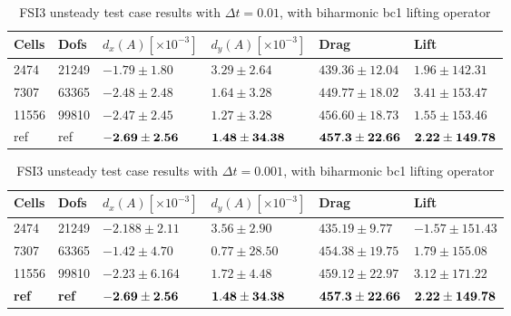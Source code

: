 \begin{table}[H]
\centering
\caption{FSI3 unsteady test case results with $\Delta t = 0.01$, with biharmonic bc1 lifting operator}
\label{tab:FSI3_001}
\begin{tabular}{|l|l|l|l|l|l|}
\hline
Cells & Dofs & $d_x (A)[\times10^{-3} ]$ & $d_y (A)[\times10^{-3} ]$ & Drag & Lift \\ \hline
2474 & 21249 & $-1.79 \pm 1.80$ & $3.29 \pm 2.64$ & $439.36 \pm 12.04$ & $1.96 \pm 142.31$ \\ \hline
7307 & 63365 & $-2.48 \pm 2.48$ & $ 1.64 \pm 3.28$ & $449.77 \pm 18.02$ & $3.41 \pm 153.47$ \\ \hline
11556 & 99810 & $ -2.47 \pm 2.45$ & $ 1.27 \pm 3.28$ & $456.60 \pm 18.73$ & $1.55 \pm 153.46$ \\ \hline
ref & ref & $\bold{-2.69 \pm  2.56}$ & $\bold{1.48 \pm 34.38}$ & $\bold{457.3 \pm 22.66}$ & $\bold{2.22 \pm 149.78}$ \\ \hline
\end{tabular}
\end{table}

\begin{table}[H]
\centering
\caption{FSI3 unsteady test case results with $\Delta t = 0.001$, with biharmonic bc1 lifting operator}
\label{tab:FSI3_0001}
\begin{tabular}{|l|l|l|l|l|l|}
\hline
Cells & Dofs & $d_x (A)[\times10^{-3} ]$ & $d_y (A)[\times10^{-3} ]$ & Drag & Lift \\ \hline
2474 & 21249 & $ -2.188 \pm 2.11 $ & $ 3.56 \pm 2.90 $ & $ 435.19 \pm 9.77$ & $ -1.57 \pm 151.43 $ \\ \hline
7307 & 63365 & $ -1.42 \pm 4.70 $ & $ 0.77 \pm 28.50 $ & $ 454.38 \pm 19.75 $ & $1.79 \pm 155.08 $ \\ \hline
11556 & 99810 & $ -2.23 \pm 6.164 $ & $ 1.72 \pm 4.48 $ & $ 459.12 \pm 22.97 $ & $ 3.12 \pm 171.22 $ \\ \hline
\textbf{ref} & \textbf{ref} & $\bold{-2.69} \pm \bold{2.56}$ & $\bold{1.48} \pm \bold{34.38}$ & $\bold{457.3} \pm \bold{22.66}$ & $\bold{2.22} \pm \bold{149.78}$ \\ \hline
\end{tabular}
\end{table}

